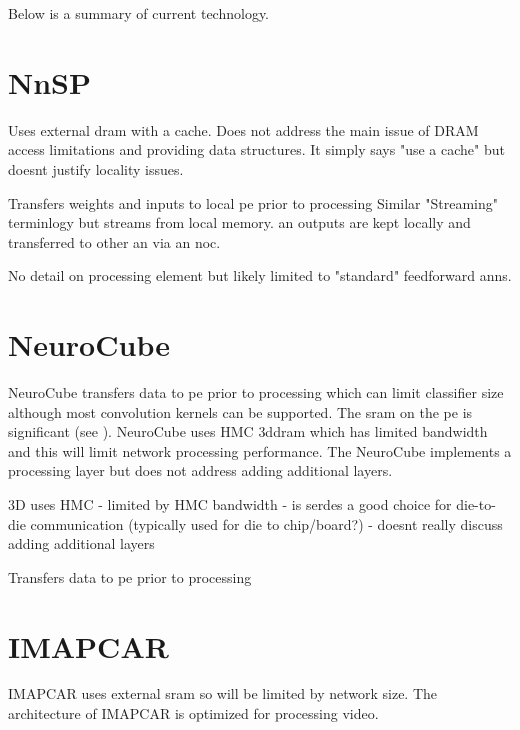 {{{{Below is a summary of current technology.

\section[NnSP]{NnSP{\cite{esmaeilzadeh2005nnsp}}}

Uses external \ac{dram} with a cache.
Does not address the main issue of DRAM access limitations and providing data structures.
It simply says "use a cache" but doesnt justify locality issues.

Transfers weights and inputs to local \ac{pe} prior to processing
Similar "Streaming" terminlogy but streams from local memory.
\ac{an} outputs are kept locally and transferred to other \ac{an} via an  \ac{noc}.

No detail on processing element but likely limited to "standard" feedforward \acp{ann}.


\section[NeuroCube]{NeuroCube{\cite{kim2016neurocube}}}
NeuroCube\cite{kim2016neurocube} transfers data to \ac{pe} prior to processing which can limit classifier size although most
convolution kernels can be supported.
The \ac{sram} on the \ac{pe} is significant (see ).
NeuroCube uses HMC \ac{3ddram} which has limited bandwidth and this will limit network processing performance.
The NeuroCube implements a processing layer but does not address adding additional layers. 

3D uses HMC
 - limited by HMC bandwidth
 - is serdes a good choice for die-to-die communication (typically used for die to chip/board?)
 - doesnt really discuss adding additional layers

Transfers data to \ac{pe} prior to processing


\section[IMAPCAR]{IMAPCAR \cite{kyo2011imapcar}}
IMAPCAR uses external \ac{sram} so will be limited by network size.
The architecture of IMAPCAR is optimized for processing video.

}}}}
